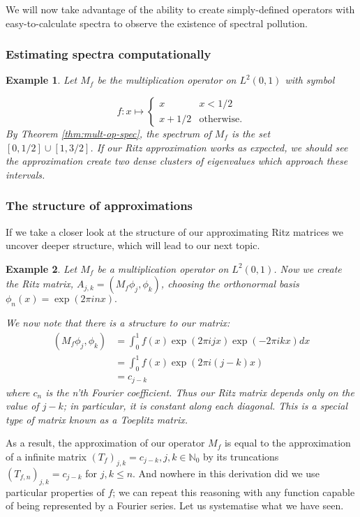 \documentclass{article}
\newcommand{\1}{\mathbf{1}}
\newtheorem{example}{Example}[section]
\begin{document}
We will now take advantage of the ability to create simply-defined operators with easy-to-calculate
spectra to observe the existence of spectral pollution.

\subsubsection{Estimating spectra computationally}
\begin{example}
Let $M_f$ be the multiplication operator on $L^2(0, 1)$ with symbol

$$
f: x \mapsto \begin{cases}
x & x < 1/2 \\
x + 1/2 & \text{otherwise.}
\end{cases}
$$
By Theorem \ref{thm:mult-op-spec}, the spectrum of $M_f$ is the set $[0, 1/2] \cup [1, 3/2]$. If our Ritz approximation works as expected, we should
see the approximation create two dense clusters of eigenvalues which approach these intervals.
\end{example}

\subsubsection{The structure of approximations}
If we take a closer look at the structure of our approximating Ritz matrices we uncover deeper structure, which will lead
to our next topic.
\begin{example}\label{exp:mult-op-toeplitz}
Let $M_f$ be a multiplication operator on $L^2(0, 1)$. Now we create the Ritz matrix, $A_{j,k} = (M_f \phi_j, \phi_k)$, 
choosing the orthonormal basis $\phi_n(x) = \exp(2 \pi i n x).$

We now note that there is a structure to our matrix:
\begin{align*}
(M_f \phi_j, \phi_k) & = \int_0^1 f(x) \exp(2 \pi i j x) \exp(-2 \pi i k x) dx \\
& = \int_0^1 f(x) \exp(2 \pi i (j-k) x)\\
& = c_{j-k}
\end{align*}
where $c_n$ is the n'th Fourier coefficient. Thus our Ritz matrix depends only on the value of $j-k$; in particular, it is constant
along each diagonal. This is a special type of matrix known as a Toeplitz matrix.
\end{example}
As a result, the approximation of our operator $M_f$ is equal to the approximation of a infinite matrix $(T_f)_{j,k} = c_{j-k},
j,k \in \mathbb{N}_0$ by its truncations $(T_{f,n})_{j,k} = c_{j-k}$ for $j, k \leq n$. And nowhere in this derivation did we use particular
properties of $f$; we can repeat this reasoning with any function capable of being represented by a Fourier series. Let us systematise
what we have seen.
\end{document}
